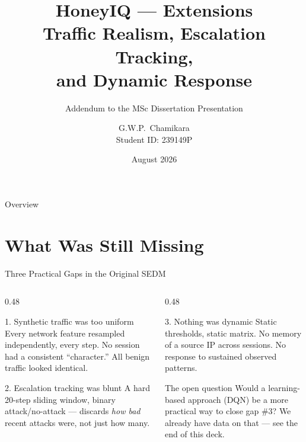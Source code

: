 \documentclass[aspectratio=169, 12pt]{beamer}
\title[HoneyIQ Extensions]{%
  \textbf{HoneyIQ — Extensions}\\
  \large Traffic Realism, Escalation Tracking,\\ and Dynamic Response}
\subtitle{Addendum to the MSc Dissertation Presentation}
\author{G.W.P.\ Chamikara \\ \small Student ID: 239149P}
\institute{%
  Department of Computer Science \& Engineering\\
  Faculty of Engineering}
\date{August 2026}
\begin{document}
\begin{frame}
  \titlepage
\end{frame}

\begin{frame}{Overview}
  \tableofcontents
\end{frame}

\section{What Was Still Missing}

\begin{frame}{Three Practical Gaps in the Original SEDM}
  \begin{columns}[T]
    \begin{column}{0.48\textwidth}
      \begin{alertblock}{1. Synthetic traffic was too uniform}
        Every network feature resampled independently, every step.
        No session had a consistent ``character.'' All benign traffic
        looked identical.
      \end{alertblock}
      \vspace{0.2cm}
      \begin{alertblock}{2. Escalation tracking was blunt}
        A hard 20-step sliding window, binary attack/no-attack —
        discards \emph{how bad} recent attacks were, not just how many.
      \end{alertblock}
    \end{column}
    \begin{column}{0.48\textwidth}
      \begin{alertblock}{3. Nothing was dynamic}
        Static thresholds, static matrix. No memory of a source IP
        across sessions. No response to sustained observed patterns.
      \end{alertblock}
      \vspace{0.2cm}
      \begin{exampleblock}{The open question}
        Would a learning-based approach (DQN) be a more practical way
        to close gap \#3? We already have data on that — see the end
        of this deck.
      \end{exampleblock}
    \end{column}
  \end{columns}
\end{frame}
\end{document}
